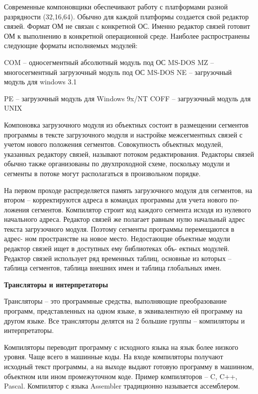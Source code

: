 Современные компоновщики обеспечивают работу с платформами разной разрядности (32,16,64). Обычно для каждой платформы создается свой редактор связей. Формат ОМ не связан с конкретной ОС. Именно редактор связей готовит ОМ к выполнению в конкретной операционной среде. Наиболее распространены следующие форматы исполняемых модулей:

COM – односегментный абсолютный модуль под ОС MS-DOS MZ – многосегментный загрузочный модуль под ОС MS-DOS NE – загрузочный модуль для windows 3.1

PE – загрузочный модуль для Windows 9x/NT COFF – загрузочный модуль для UNIX

Компоновка загрузочного модуля из объектных состоит в размещении сегментов программы в тексте загрузочного модуля и настройке межсегментных связей с учетом нового положения сегментов. Совокупность объектных модулей, указанных редактору связей, называют потоком редактирования. Редакторы связей обычно также организованы по двухпроходной схеме, поскольку модули и сегменты в потоке могут располагаться в произвольном порядке. 

На первом проходе распределяется память загрузочного модуля для сегментов, на втором – корректируются адреса в командах программы для учета нового по- ложения сегментов. Компилятор строит код каждого сегмента исходя из нулевого начального адреса. Редактор связей же полагает равным нулю начальный адрес текста загрузочного модуля. Поэтому сегменты программы перемещаются в адрес- ном пространстве на новое место. Недостающие объектные модули редактор связей ищет в доступных ему библиотеках объ- ектных модулей. Редактор связей использует ряд временных таблиц, основные из которых – таблица сегментов, таблица внешних имен и таблица глобальных имен.

\begin{center}{\bfseries Трансляторы и интерпретаторы}
\end{center}

Трансляторы – это программные средства, выполняющие преобразование программ, представленных на одном языке, в эквивалентную ей программу на другом языке. Все трансляторы делятся на 2 большие группы – компиляторы и интерпретаторы. 

Компиляторы переводит программу с исходного языка на язык более низкого уровня. Чаще всего в машинные коды. На входе компиляторы получают исходный текст программы, а на выходе выдают готовую программу в машинном, объектном или ином промежуточном коде. Пример компиляторов – C, C++, Pascal. Компилятор с языка Assembler традиционно называется ассемблером.

